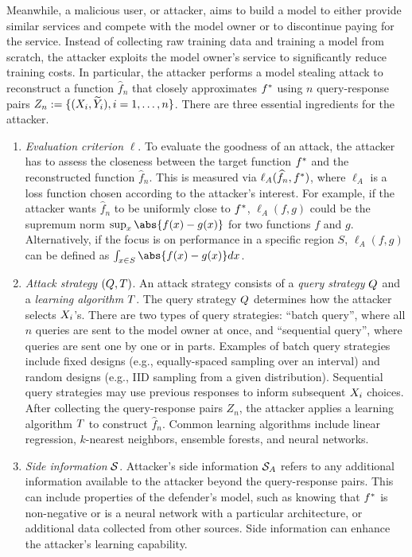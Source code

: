     Meanwhile, a malicious user, or attacker, aims to build a model to either provide similar services and compete with the model owner or to discontinue paying for the service. Instead of collecting raw training data and training a model from scratch, the attacker exploits the model owner's service to significantly reduce training costs. In particular, the attacker performs a model stealing attack to reconstruct a function $\hat{f}_n$ that closely approximates $f^*$ using $n$ query-response pairs $Z_n:= \{(X_i, \widetilde{Y}_i),i=1,\dots,n\}$. There are three essential ingredients for the attacker.
    \begin{enumerate}
        \item \textit{ Evaluation criterion} $\ell$. To evaluate the goodness of an attack, the attacker has to assess the closeness between the target function $f^*$ and the reconstructed function $\hat{f}_n$. This is measured via $\ell_A(\widehat{f}_n, f^*)$, where $\ell_A$ is a loss function chosen according to the attacker's interest. For example, if the attacker wants $\hat{f}_n$ to be uniformly close to $f^*$, $\ell_A(f, g)$ could be the supremum norm $\sup_x \abs{f(x)-g(x)}$ for two functions $f$ and $g$. Alternatively, if the focus is on performance in a specific region $S$, $\ell_A(f, g)$ can be defined as $\int_{x \in S} \abs{f(x) - g(x)} dx$.
        
        \item \textit{ Attack strategy} $(Q, T)$. An attack strategy consists of a \textit{query strategy} $Q$ and a \textit{learning algorithm} $T$. The query strategy $Q$ determines how the attacker selects $X_i$'s. There are two types of query strategies: ``batch query'', where all $n$ queries are sent to the model owner at once, and ``sequential query'', where queries are sent one by one or in parts.
        Examples of batch query strategies include fixed designs (e.g., equally-spaced sampling over an interval) and random designs (e.g., IID sampling from a given distribution). Sequential query strategies may use previous responses to inform subsequent $X_i$ choices. After collecting the query-response pairs $Z_n$, the attacker applies a learning algorithm $T$ to construct $\hat{f}_n$. Common learning algorithms include linear regression, $k$-nearest neighbors, ensemble forests, and neural networks. 

        \item \textit{ Side information} $\mathcal{S}$.  
        Attacker's side information $\mathcal{S}_A$ refers to any additional information available to the attacker beyond the query-response pairs. This can include properties of the defender's model, such as knowing that $f^*$ is non-negative or is a neural network with a particular architecture, or additional data collected from other sources. Side information can enhance the attacker's learning capability.
    \end{enumerate}

